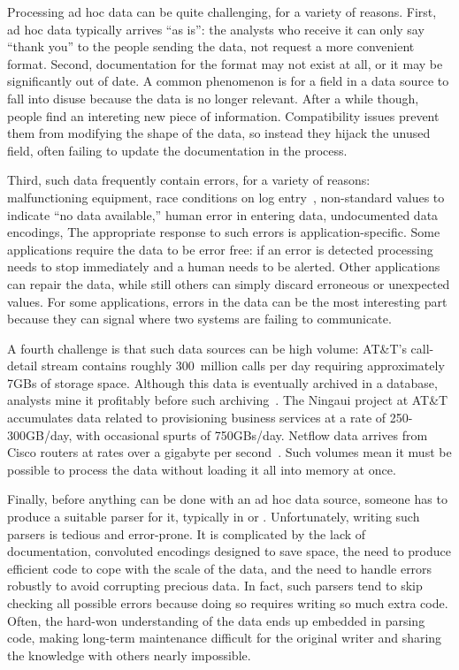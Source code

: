 \documentclass{sig-alternate}
\begin{document}
Processing ad hoc data can be quite challenging, for a variety of
reasons. First, ad hoc data typically arrives ``as is'': the analysts
who receive it can only say ``thank you'' to the people sending the
data, not request a more convenient format. 
Second, documentation for the format may not exist at all, or it may be
significantly out of date.  A common phenomenon is for a field in a
data source to fall into disuse because the data is no longer
relevant.  After a while though, people find an intereting new piece of
information.  Compatibility issues prevent them from modifying the
shape of the data, so instead they hijack the unused field, often
failing to update the documentation in the process.

Third, such data frequently contain errors, for a variety of
reasons: malfunctioning equipment, race conditions on log
entry~\cite{wpp}, non-standard values to indicate ``no data
available,'' human error in entering data, undocumented data
encodings, \etc{} The appropriate response to such errors is
application-specific. Some applications require the data to be error free: 
if an error is detected processing needs to stop immediately and a human
needs to be alerted.  Other applications can repair the data, while still
others can simply discard erroneous or unexpected values.  
For some applications,
errors in the data can be the most interesting part  because
they can signal where two systems are failing to communicate.

A fourth challenge is that such data sources can be high volume:
AT\&T's call-detail stream contains roughly 300~million calls per day
requiring approximately 7GBs of storage space. Although this data is
eventually archived in a database, analysts mine it profitably before
such archiving~\cite{kdd98,kdd99,kdd00}. The Ningaui project at AT\&T
accumulates data related to provisioning business services at a rate
of 250-300GB/day, with occasional spurts of 750GBs/day.  Netflow data
arrives from Cisco routers at rates over a gigabyte per
second~\cite{gigascope}. Such volumes mean it must be possible to
process the data without loading it all into memory at once.

Finally, before anything can be done with an ad hoc data source,
someone has to produce a suitable parser for it, typically in \C{} or \perl{}. 
Unfortunately, writing
such parsers is tedious and error-prone. It is complicated by the lack
of documentation, convoluted encodings designed to save space, 
the need to produce efficient code to cope with the scale of the data,
and the need to handle errors robustly to avoid corrupting precious data.
In fact, such parsers tend to skip checking all possible errors
because doing so requires writing so much extra code. 
Often, the hard-won understanding of the data
ends up embedded in parsing code, making long-term maintenance
difficult for the original writer and sharing the knowledge with
others nearly impossible.
\end{document}
